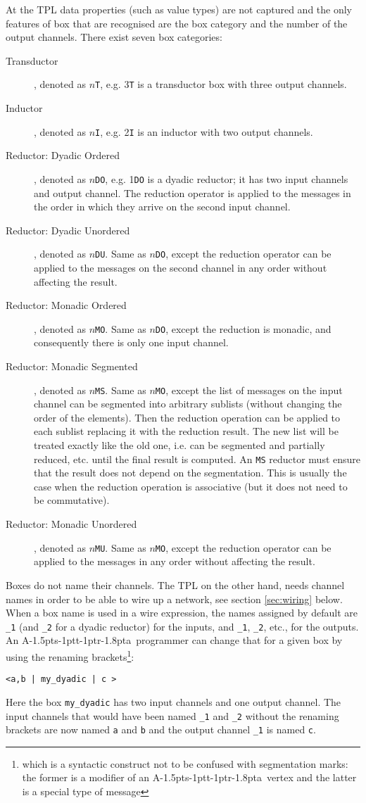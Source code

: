 \documentclass[11pt]{report}
\def\ak{{\textsf{A\kern-1.5pts\kern-1ptt\kern-1ptr\kern-1.8pta}}\kern-2pt{\it K\kern-2ptahn}}
\begin{document}
At the TPL data properties (such as value types) are not captured and the only features of box that are recognised are the box category and the number of the output channels. There exist seven box categories:
\begin{description}
\item[Transductor], denoted as $n$\verb$T$, e.g. 3\verb$T$ is a transductor box with three output channels.
\item[Inductor],  denoted as $n$\verb$I$, e.g. 2\verb$I$ is an inductor with two output channels.
\item[Reductor: Dyadic Ordered], denoted as $n$\verb$DO$, e.g. 1\verb$DO$ is a dyadic reductor; it has two input channels and output channel. The reduction operator is applied to the messages in the order in which they arrive on the second input channel.
\item[Reductor: Dyadic Unordered] , denoted as $n$\verb$DU$. Same as $n$\verb$DO$, except the reduction operator can be applied to the messages on the second channel in any order without affecting the result.
\item[Reductor: Monadic Ordered], denoted as $n$\verb$MO$. Same as $n$\verb$DO$, except the reduction is monadic, and consequently there is only one input channel.
\item[Reductor: Monadic Segmented], denoted as $n$\verb$MS$. Same as $n$\verb$MO$, except the list of messages on the input channel can be segmented into arbitrary sublists (without changing the order of the elements). Then the reduction operation can be applied to each sublist replacing it with the reduction result. The new list will be treated exactly like the old one, i.e. can be segmented and partially reduced, etc. until the final result is computed. An \verb$MS$ reductor must ensure that the result does not depend on the segmentation. This is usually the case when the reduction operation
is associative (but it does not need to be commutative).
\item[Reductor: Monadic Unordered] , denoted as $n$\verb$MU$. Same as $n$\verb$MO$, except the reduction operator can be applied to the messages in any order without affecting the result.
\end{description}

Boxes do not name their channels. The TPL on the other hand, needs channel names in order to be able to wire up a network, see section \ref{sec:wiring} below. When a box name is used in a wire expression, the names assigned by default are \verb$_1$ (and \verb$_2$ for a dyadic reductor) for the inputs, and \verb$_1$, \verb$_2$, etc., for the outputs. An \ak\ programmer can change that for a given box by using the renaming brackets\footnote{which is a syntactic construct not to be confused with segmentation marks: the former is a modifier of an \ak\ vertex and the latter is a special type of message}:
\begin{lstlisting}
<a,b | my_dyadic | c >
\end{lstlisting}
Here the box \verb$my_dyadic$ has two input channels and one output channel. The input channels that would have been named \verb$_1$ and \verb$_2$  without the renaming brackets are now named \verb$a$ and \verb$b$ and the output channel \verb$_1$ is named \verb$c$.
\end{document}
